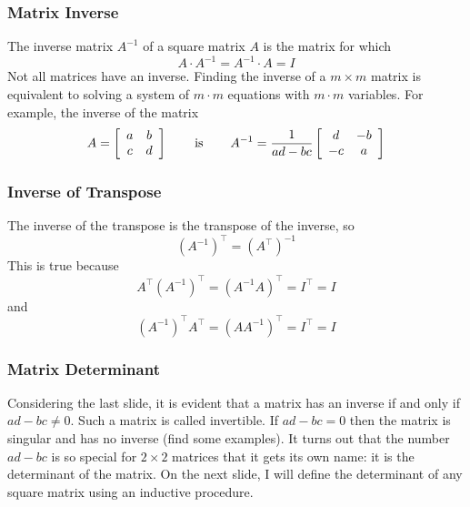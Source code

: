 \documentclass[xcolor=dvipsnames]{beamer}
\begin{document}
\begin{frame}
  \frametitle{Matrix Inverse}
The \alert{inverse matrix} $A^{-1}$ of a square matrix $A$ is the
matrix for which
\begin{equation}
  \label{eq:quoovain}
  A\cdot{}A^{-1}=A^{-1}\cdot{}A=I
\end{equation}
Not all matrices have an inverse. Finding the inverse of a
$m\times{}m$ matrix is equivalent to solving a system of $m\cdot{}m$
equations with $m\cdot{}m$ variables. For example, the inverse of the
matrix
\begin{equation}
  \label{eq:iiphiese}
  A=\left[
    \begin{array}{cc}
      a & b \\
      c & d
    \end{array}\right]\hspace{.25in}\mbox{ is }\hspace{.25in}A^{-1}=\frac{1}{ad-bc}\left[
    \begin{array}{cc}
      d & -b \\
      -c & a
    \end{array}\right]
\end{equation}
\end{frame}

\begin{frame}
  \frametitle{Inverse of Transpose}
  The inverse of the transpose is the transpose of the inverse, so
  \begin{equation}
    \label{eq:ieroonge}
    \left(A^{-1}\right)^{\intercal}=\left(A^{\intercal}\right)^{-1}
  \end{equation}
  This is true because
  \begin{equation}
    \label{eq:gahmagee}
    A^{\intercal}\left(A^{-1}\right)^{\intercal}=\left(A^{-1}A\right)^{\intercal}=I^{\intercal}=I
  \end{equation}
  and
  \begin{equation}
    \label{eq:raengied}
    \left(A^{-1}\right)^{\intercal}A^{\intercal}=\left(AA^{-1}\right)^{\intercal}=I^{\intercal}=I
  \end{equation}
\end{frame}

\begin{frame}
  \frametitle{Matrix Determinant}
  Considering the last slide, it is evident that a matrix has an
  inverse if and only if $ad-bc\neq{}0$. Such a matrix is called
  \alert{invertible}. If $ad-bc=0$ then the matrix is \alert{singular}
  and has no inverse (find some examples). It turns out that the
  number $ad-bc$ is so special for $2\times{}2$ matrices that it gets
  its own name: it is the \alert{determinant} of the matrix. On the
  next slide, I will define the determinant of any square matrix using
  an inductive procedure.
\end{frame}
\end{document}
